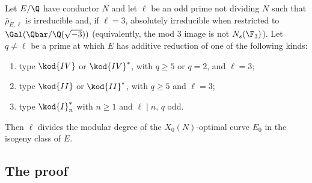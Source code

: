 \begin{theorem}\label{thm:modgalrep:qual}
Let $E/\Q$ have conductor $N$ and let $\ell$ be an odd prime not dividing $N$ such that $\bar\rho_{E,\ell}$ is irreducible and, if $\ell=3$, absolutely irreducible when
restricted to $\Gal(\Qbar/\Q(\sqrt{-3}))$ (equivalently, the mod $3$ image is not $N_s(\F_3)$). Let $q\ne\ell$ be a prime at which $E$ has additive reduction of one of the
following kinds:
\begin{enumerate}[label=(\alph*)]
\item type $\kod{IV}$ or $\kod{IV}^*$, with $q\ge5$ or $q=2$, and $\ell=3$;
\item type $\kod{II}$ or $\kod{II}^*$, with $q\ge5$ and $\ell=3$;
\item type $\kod{I}_n^*$ with $n\ge1$ and $\ell\mid n$, $q$ odd.
\end{enumerate}
Then $\ell$ divides the modular degree of the $X_0(N)$-optimal curve $E_0$ in the isogeny class of $E$.
\end{theorem}

\subsection{The proof}\label{sec:modgalrep:proof-qual}

